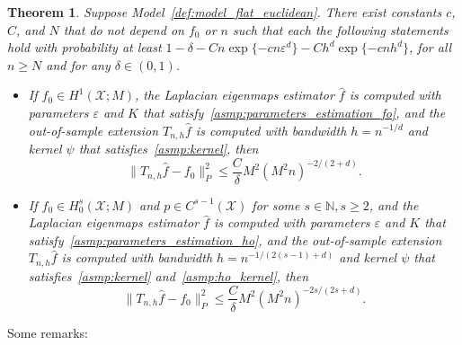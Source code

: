 \documentclass[aos]{imsart}
\theoremstyle{plain}
\newtheorem{theorem}{Theorem}
\theoremstyle{definition}
\theoremstyle{remark}
\newcommand{\wh}[1]{\widehat{#1}}
\newcommand{\mc}[1]{\mathcal{#1}}
\newcommand{\1}{\mathbf{1}}
\begin{document}
\begin{theorem}
	\label{thm:laplacian_eigenmaps_estimation_out_of_sample}
	Suppose Model~\ref{def:model_flat_euclidean}. There exist constants $c$, $C$, and $N$ that do not depend on $f_0$ or $n$ such that each the following statements hold with probability at least $1 - \delta - Cn\exp\{-cn\varepsilon^d\} - Ch^d\exp\{-cnh^d\}$,  for all $n \geq N$ and for any $\delta \in (0,1)$.
	\begin{itemize}
		\item If $f_0 \in H^1(\mc{X};M)$, the Laplacian eigenmaps estimator $\wh{f}$ is computed with parameters $\varepsilon$ and $K$ that satisfy~\ref{asmp:parameters_estimation_fo}, and the out-of-sample extension $T_{n,h}\wh{f}$ is computed with bandwidth $h = n^{-1/d}$ and kernel $\psi$ that satisfies~\ref{asmp:kernel}, then
		\begin{equation*}
		\|T_{n,h}\wh{f} - f_0\|_P^2 \leq \frac{C}{\delta}M^2(M^2n)^{-2/(2 + d)}.
		\end{equation*}
		\item If $f_0 \in H_0^s(\mc{X};M)$ and $p \in C^{s - 1}(\mc{X})$ for some $s \in \mathbb{N}, s \geq 2$, and the Laplacian eigenmaps estimator $\wh{f}$ is computed with parameters $\varepsilon$ and $K$ that satisfy~\ref{asmp:parameters_estimation_ho}, and the out-of-sample extension $T_{n,h}\wh{f}$ is computed with bandwidth $h = n^{-1/(2(s - 1) + d)}$ and kernel $\psi$ that satisfies~\ref{asmp:kernel} and~\ref{asmp:ho_kernel}, then
		\begin{equation*}
		\|T_{n,h}\wh{f} - f_0\|_P^2 \leq \frac{C}{\delta}M^2(M^2n)^{-2s/(2s + d)}.
		\end{equation*}
	\end{itemize}
\end{theorem}
Some remarks:
\end{document}
